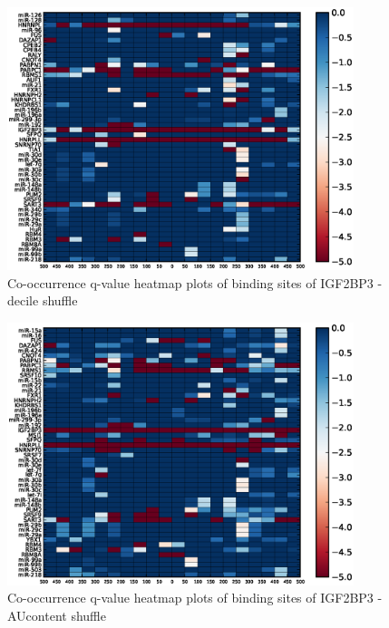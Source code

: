 \begin{figure}
	\includegraphics[width=0.9\textwidth]{appendix1/figures/IGF2BP3_decile_expressed_heatmap_qvalues0.eps}
	\caption{Co-occurrence q-value heatmap plots of binding sites of IGF2BP3 - decile shuffle}
\end{figure}
\clearpage
\begin{figure}
   	\includegraphics[width=0.9\textwidth]{appendix1/figures/IGF2BP3_AUcontent_expressed_heatmap_qvalues0.eps}
   	\caption{Co-occurrence q-value heatmap plots of binding sites of IGF2BP3 - AUcontent shuffle}
\end{figure}

